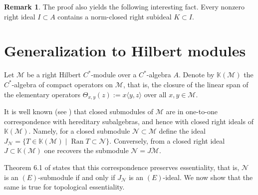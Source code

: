 \documentclass[reqno,a4paper,12pt]{amsart}
\theoremstyle{plain}
\theoremstyle{definition}
\newtheorem*{remark}{Remark}
\newcommand{\inner}[2]{\langle #1, #2 \rangle}
\newcommand{\KK}{\mathbb K}
\newcommand{\M}{\mathcal M}
\newcommand{\N}{\mathcal N}
\begin{document}
	\begin{remark}
		The proof also yields the following interesting fact. Every nonzero right ideal $I \subset A$ contains a norm-closed right subideal $K \subset I$.
	\end{remark}
	
	\section{Generalization to Hilbert modules}
	\label{sec:modules}
	Let $\M$ be a right Hilbert $C^*$-module over a $C^*$-algebra $A$.
	Denote by $\KK(\M)$ the $C^*$-algebra of compact operators on $\M$, that is, the closure of the linear span of the elementary operators $\Theta_{x,y}(z) := x\inner yz$ over all $x, y \in \M$.
	
	It is well known (see \cite[Corollary 4.2]{meyer}) that closed submodules of $\M$ are in one-to-one correspondence with hereditary subalgebras, and hence with closed right ideals of $\KK(\M)$.
	Namely, for a closed submodule $\N \subset \M$ define the ideal $J_\N = \{ T \in \KK(\M) \mid \operatorname{Ran} T \subset \N \}$.
	Conversely, from a closed right ideal $J \subset \KK(\M)$ one recovers the submodule $\N = \overline{J\M}$.
	
	Theorem 6.1 of \cite{manuilov} states that this correspondence preserves essentiality, that is, $\N$ is an $(E)$-submodule if and only if $J_\N$ is an $(E)$-ideal.
	We now show that the same is true for topological essentiality.
	
\end{document}
